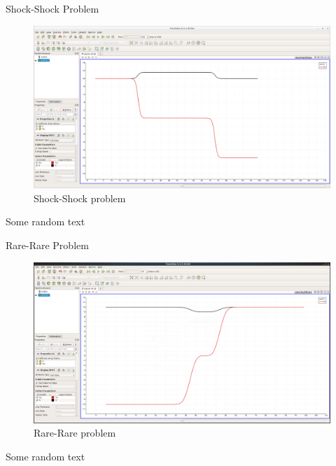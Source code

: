 \documentclass[shortpres]{beamer}
\newcommand{\imgvoffset}{-20pt}
\newcommand{\imgfullscale}{0.75}
\begin{document}
\begin{frame}{Shock-Shock Problem}
	\begin{figure}[t]
		\vspace{\imgvoffset}
		\includegraphics[clip, width=\imgfullscale\linewidth]{img/Shock-Shock.png}
		\caption*{Shock-Shock problem}
	\end{figure}
	Some random text
\end{frame}

\begin{frame}{Rare-Rare Problem}
	\begin{figure}[t]
		\vspace{\imgvoffset}
		\includegraphics[clip, width=\imgfullscale\linewidth]{img/Rare-Rare.png}
		\caption*{Rare-Rare problem}
	\end{figure}
	Some random text
\end{frame}
\end{document}

